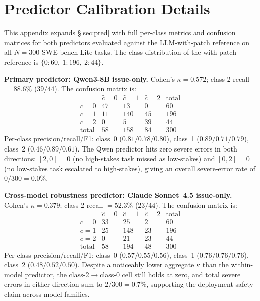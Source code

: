 \documentclass{article}
\begin{document}
\section{Predictor Calibration Details}
\label{app:predictor}

This appendix expands \S\ref{sec:pred} with full per-class metrics and
confusion matrices for both predictors evaluated against the
LLM-with-patch reference on all $N{=}300$ SWE-bench Lite tasks. The
class distribution of the with-patch reference is
$\{0{:}60,\ 1{:}196,\ 2{:}44\}$.

\textbf{Primary predictor: Qwen3-8B issue-only.} Cohen's
$\kappa = 0.572$; class-2 recall $= 88.6\%$ ($39/44$). The confusion
matrix is:
\[
\begin{array}{c|ccc|c}
& \hat{c}{=}0 & \hat{c}{=}1 & \hat{c}{=}2 & \text{total} \\\hline
c{=}0 & 47  & 13  & 0  & 60  \\
c{=}1 & 11  & 140 & 45 & 196 \\
c{=}2 & 0   & 5   & 39 & 44  \\\hline
\text{total} & 58 & 158 & 84 & 300
\end{array}
\]
Per-class precision/recall/F1: class~0 ($0.81/0.78/0.80$), class~1
($0.89/0.71/0.79$), class~2 ($0.46/0.89/0.61$). The Qwen predictor
hits zero severe errors in both directions: $[2,0]=0$
(no high-stakes task missed as low-stakes) and $[0,2]=0$
(no low-stakes task escalated to high-stakes), giving an overall
severe-error rate of $0/300 = 0.0\%$.

\textbf{Cross-model robustness predictor: Claude Sonnet~4.5
issue-only.} Cohen's $\kappa = 0.379$; class-2 recall $= 52.3\%$
($23/44$). The confusion matrix is:
\[
\begin{array}{c|ccc|c}
& \hat{c}{=}0 & \hat{c}{=}1 & \hat{c}{=}2 & \text{total} \\\hline
c{=}0 & 33 & 25 & 2 & 60 \\
c{=}1 & 25 & 148 & 23 & 196 \\
c{=}2 & 0 & 21 & 23 & 44 \\\hline
\text{total} & 58 & 194 & 48 & 300
\end{array}
\]
Per-class precision/recall/F1: class~0 ($0.57/0.55/0.56$), class~1
($0.76/0.76/0.76$), class~2 ($0.48/0.52/0.50$). Despite a noticeably
lower aggregate $\kappa$ than the within-model predictor, the
class-2$\to$class-0 cell still holds at zero, and total severe
errors in either direction sum to $2/300 = 0.7\%$, supporting
the deployment-safety claim across model families.
\end{document}
